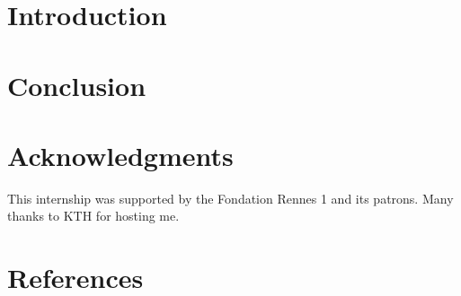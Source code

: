 \documentclass[11pt]{sdm_internship}
\title{}
\author{Simon \textsc{Bihel}}
\begin{document}
\maketitle

\section*{Introduction}
\label{intro}


\section*{Conclusion}
\label{conclu}


\section*{Acknowledgments}
This internship was supported by the Fondation Rennes 1 and its patrons.
Many thanks to KTH for hosting me.


\section*{References}


\end{document}
